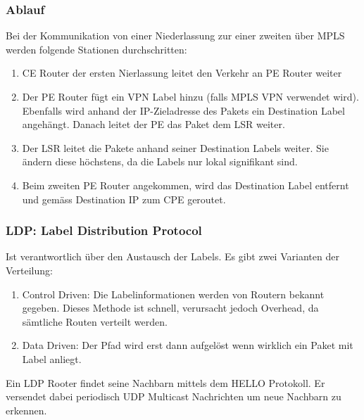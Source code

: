\subsubsection{Ablauf}
Bei der Kommunikation von einer Niederlassung zur einer zweiten über MPLS werden folgende Stationen durchschritten:
\begin{enumerate}
	\item CE Router der ersten Nierlassung leitet den Verkehr an PE Router weiter
	\item Der PE Router fügt ein VPN Label hinzu (falls MPLS VPN verwendet wird). Ebenfalls wird anhand der IP-Zieladresse des Pakets ein Destination Label angehängt. Danach leitet der PE das Paket dem LSR weiter.
	\item Der LSR leitet die Pakete anhand seiner Destination Labels weiter. Sie ändern diese höchstens, da die Labels nur lokal signifikant sind.
	\item Beim zweiten PE Router angekommen, wird das Destination Label entfernt und gemäss Destination IP zum CPE geroutet. 
\end{enumerate}	


\subsubsection{LDP: Label Distribution Protocol}
Ist verantwortlich über den Austausch der Labels. Es gibt zwei Varianten der Verteilung: 
\begin{enumerate}
	\item Control Driven: Die Labelinformationen werden von Routern bekannt gegeben. Dieses Methode ist schnell, verursacht jedoch Overhead, da sämtliche Routen verteilt werden.
	\item Data Driven: Der Pfad wird erst dann aufgelöst wenn wirklich ein Paket mit Label anliegt.
\end{enumerate}
Ein LDP Rooter findet seine Nachbarn mittels dem HELLO Protokoll. Er versendet dabei periodisch UDP Multicast Nachrichten um neue Nachbarn zu erkennen.

